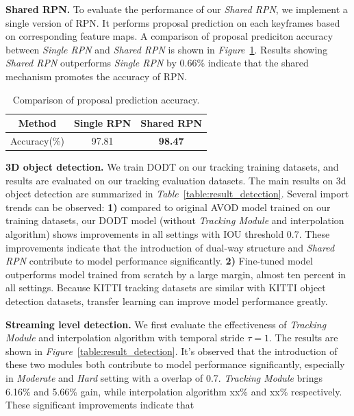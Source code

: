 \documentclass[letterpaper, 10 pt, conference]{ieeeconf}  %
\def\figurename{\emph{Figure}}
\def\tablename{\emph{Table}}
\begin{document}
\textbf{Shared RPN.} To evaluate the performance of our \textit{Shared RPN}, we implement a single version of RPN. It performs proposal prediction on each keyframes based on corresponding feature maps. A comparison of proposal prediciton accuracy between \textit{Single RPN} and \textit{Shared RPN} is shown in \figurename \, \ref{table:rpn_result}. Results showing \textit{Shared RPN} outperforms \textit{Single RPN} by 0.66\% indicate that the shared mechanism promotes the accuracy of RPN. 
\begin{table}[h]\centering
	\vspace{-0.2cm}
		\begin{tabular}{ccc}
			\toprule[1pt]
			Method        & Single RPN & Shared RPN  \\ \midrule
			Accuracy(\%)  & 97.81      & \textbf{98.47}       \\
			\bottomrule[1pt]
	\end{tabular}
	\caption{Comparison of proposal prediction accuracy.}
	\label{table:rpn_result}
	\vspace{-0.2cm}
\end{table}

\textbf{3D object detection.} We train DODT on our tracking training datasets, and results are evaluated on our tracking evaluation datasets. The main results on 3d object detection are summarized in \tablename \, \ref{table:result_detection}. Several import trends can be observed: \textbf{1)} compared to original AVOD\cite{ku2018joint} model trained on our training datasets, our DODT model (without \textit{Tracking Module} and interpolation algorithm) shows improvements in all settings with IOU threshold 0.7. These improvements indicate that the introduction of dual-way structure and \textit{Shared RPN} contribute to model performance significantly. \textbf{2)} Fine-tuned model outperforms model trained from scratch by a large margin, almost ten percent in all settings. Because KITTI tracking datasets are similar with KITTI object detection datasets, transfer learning can improve model performance greatly. 

\textbf{Streaming level detection.} We first evaluate the effectiveness of \textit{Tracking Module} and interpolation algorithm with temporal stride $\tau = 1$. The results are shown in \figurename \, \ref{table:result_detection}. It's observed that the introduction of these two modules both contribute to model performance significantly, especially in \textit{Moderate} and \textit{Hard} setting with a overlap of 0.7. \textit{Tracking Module} brings 6.16\% and 5.66\% gain, while interpolation algorithm xx\% and xx\% respectively. These significant improvements indicate that  
\end{document}

